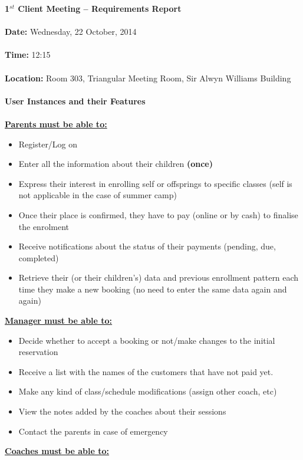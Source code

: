 \documentclass{l3proj}
\begin{document}
\textbf{\LARGE{1$^{st}$ Client Meeting -- Requirements Report}}\\
\\
\textbf{Date:} Wednesday, 22 October, 2014\\
\\
\textbf{Time:} 12:15\\
\\
\textbf{Location:} Room 303, Triangular Meeting Room, Sir Alwyn Williams Building\\
\\
\textbf{\Large{User Instances and their Features}}\\
\\
\textbf{\underline{Parents must be able to:}}
	\begin{itemize}
	\item Register/Log on
	\item Enter all the information about their children \textbf{(once)}
	\item Express their interest in enrolling self or offsprings to specific classes (self is not applicable in the case of summer camp)
	\item Once their place is confirmed, they have to pay (online or by cash) to finalise the enrolment
	\item Receive notifications about the status of their payments (pending, due, completed)
	\item Retrieve their (or their children’s) data and previous enrollment pattern each time they make a new booking (no need to enter the same data again and again)
	\end{itemize}
\textbf{\underline{Manager must be able to:}}
	\begin{itemize}
	\item Decide whether to accept a booking or not/make changes to the initial reservation
	\item Receive a list with the names of the customers that have not paid yet.
	\item Make any kind of class/schedule modifications (assign other coach, etc)
	\item View the notes added by the coaches about their sessions
	\item Contact the parents in case of emergency
	\end{itemize}
\textbf{\underline{Coaches must be able to:}}
\end{document}
